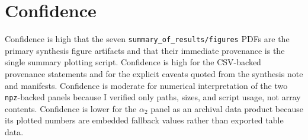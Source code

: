 \documentclass[aps,prb,onecolumn,nofootinbib,superscriptaddress]{revtex4-2}
\begin{document}
\section{Confidence}

Confidence is high that the seven \texttt{summary\_of\_results/figures} PDFs are the primary
synthesis figure artifacts and that their immediate provenance is the single summary plotting
script.  Confidence is high for the CSV-backed provenance statements and for the explicit
caveats quoted from the synthesis note and manifests.  Confidence is moderate for numerical
interpretation of the two \texttt{npz}-backed panels because I verified only paths, sizes, and
script usage, not array contents.  Confidence is lower for the $\alpha_2$ panel as an archival
data product because its plotted numbers are embedded fallback values rather than exported
table data.
\end{document}
